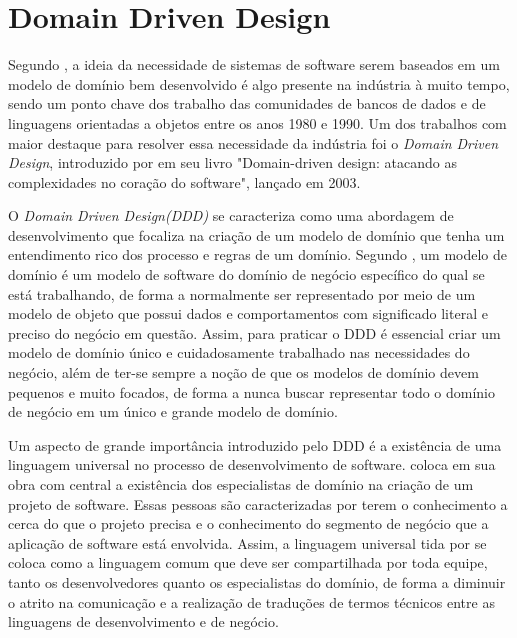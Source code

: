 \documentclass[12pt, %
openright, 
oneside, %
a4paper,    %
brazil]{facom-ufu-abntex2}
\begin{document}
\section{Domain Driven Design}
Segundo , a ideia da necessidade de sistemas de software serem baseados em um modelo de domínio bem desenvolvido é algo presente na indústria à muito tempo, sendo um ponto chave dos trabalho das comunidades de bancos de dados e de linguagens orientadas a objetos entre os anos 1980 e 1990. Um dos trabalhos com maior destaque para resolver essa necessidade da indústria foi o \textit{Domain Driven Design}, introduzido por  em seu livro "Domain-driven design: atacando as complexidades no coração do software", lançado em 2003.

O \textit{Domain Driven Design(DDD)} se caracteriza como uma abordagem de desenvolvimento que focaliza na criação de um modelo de domínio que tenha um entendimento rico dos processo e regras de um domínio. Segundo , um modelo de domínio é um modelo de software do domínio de negócio específico do qual se está trabalhando, de forma a normalmente ser representado por meio de um modelo de objeto que possui dados e comportamentos com significado literal e preciso do negócio em questão. Assim, para praticar o DDD é essencial criar um modelo de domínio único e cuidadosamente trabalhado nas necessidades do negócio, além de ter-se sempre a noção de que os modelos de domínio devem pequenos e muito focados, de forma a nunca buscar representar todo o domínio de negócio em um único e grande modelo de domínio.

Um aspecto de grande importância introduzido pelo DDD é a existência de uma linguagem universal no processo de desenvolvimento de software.  coloca em sua obra com central a existência dos especialistas de domínio na criação de um projeto de software. Essas pessoas são caracterizadas por terem o conhecimento a cerca do que o projeto precisa e o conhecimento do segmento de negócio que a aplicação de software está envolvida. Assim, a linguagem universal tida por  se coloca como a linguagem comum que deve ser compartilhada por toda equipe, tanto os desenvolvedores quanto os especialistas do domínio, de forma a diminuir o atrito na comunicação e a realização de traduções de termos técnicos entre as linguagens de desenvolvimento e de negócio.
\end{document}
